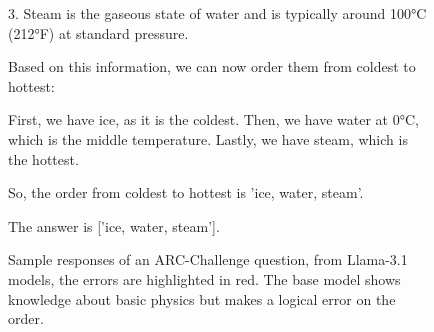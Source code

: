 \begin{figure}
\begin{bluetextbox}
    3. Steam is the gaseous state of water and is typically around 100°C (212°F) at standard pressure.
    
    Based on this information, we can now order them from coldest to hottest:
    
    First, we have ice, as it is the coldest.
    Then, we have water at 0°C, which is the middle temperature.
    Lastly, we have steam, which is the hottest.
    
    So, the order from coldest to hottest is 'ice, water, steam'.
    
    The answer is ['ice, water, steam'].

        \end{bluetextbox}
    
    \caption{Sample responses of an ARC-Challenge question, from Llama-3.1 models, the errors are highlighted in red. The base model shows knowledge about basic physics but makes a logical error on the order.}
    \label{fig:sample_arc_llama}
\end{figure}

